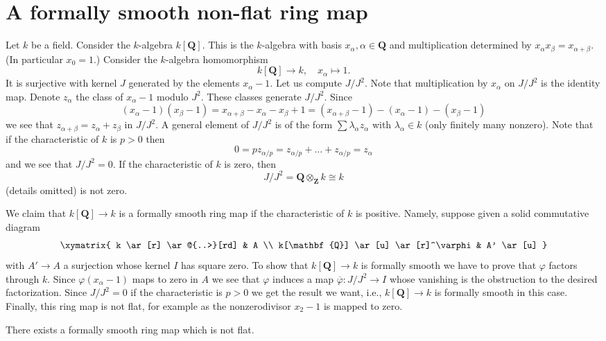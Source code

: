 \section{A formally smooth non-flat ring map}
\label{section-formally-smooth-nonflat}

\noindent
Let $k$ be a field. Consider the $k$-algebra $k[\mathbf{Q}]$.
This is the $k$-algebra with basis $x_\alpha, \alpha \in \mathbf{Q}$
and multiplication determined by $x_\alpha x_\beta = x_{\alpha + \beta}$.
(In particular $x_0 = 1$.)
Consider the $k$-algebra homomorphism
$$
k[\mathbf{Q}] \longrightarrow k, \quad
x_\alpha \longmapsto 1.
$$
It is surjective with kernel $J$ generated by the elements $x_\alpha - 1$.
Let us compute $J/J^2$. Note that multiplication by $x_\alpha$ on $J/J^2$
is the identity map. Denote $z_\alpha$ the class of $x_\alpha - 1$ modulo
$J^2$. These classes generate $J/J^2$. Since
$$
(x_\alpha - 1)(x_\beta - 1) = x_{\alpha + \beta} - x_\alpha - x_\beta + 1 =
(x_{\alpha + \beta} - 1) - (x_\alpha - 1) - (x_\beta - 1)
$$
we see that $z_{\alpha + \beta} = z_\alpha + z_\beta$ in $J/J^2$.
A general element of $J/J^2$ is of the form $\sum \lambda_\alpha z_\alpha$
with $\lambda_\alpha \in k$ (only finitely many nonzero). Note that if the
characteristic of $k$ is $p > 0$ then
$$
0 = pz_{\alpha/p} = z_{\alpha/p} + \ldots + z_{\alpha/p} = z_\alpha
$$
and we see that $J/J^2 = 0$. If the characteristic of $k$ is zero, then
$$
J/J^2 = \mathbf{Q} \otimes_{\mathbf{Z}} k \cong k
$$
(details omitted) is not zero.

\medskip\noindent
We claim that $k[\mathbf{Q}] \to k$ is a formally smooth ring map
if the characteristic of $k$ is positive. Namely, suppose given a
solid commutative diagram
$$
\xymatrix{
k \ar[r] \ar@{..>}[rd] & A \\
k[\mathbf{Q}] \ar[u] \ar[r]^\varphi & A' \ar[u]
}
$$
with $A' \to A$ a surjection whose kernel $I$ has square zero.
To show that $k[\mathbf{Q}] \to k$ is formally smooth we have to prove
that $\varphi$ factors through $k$. Since $\varphi(x_\alpha - 1)$ maps
to zero in $A$ we see that $\varphi$ induces a map
$\overline{\varphi} : J/J^2 \to I$ whose vanishing is the obstruction
to the desired factorization. Since $J/J^2 = 0$ if the characteristic
is $p > 0$ we get the result we want, i.e., $k[\mathbf{Q}] \to k$ is
formally smooth in this case. Finally, this ring map is not flat, for
example as the nonzerodivisor $x_2 - 1$ is mapped to zero.

\begin{lemma}
\label{lemma-formally-smooth-nonflat}
There exists a formally smooth ring map which is not flat.
\end{lemma}

